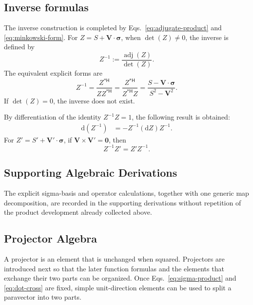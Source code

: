 \documentclass[10pt,letterpaper]{article}
\newcommand{\eqfunc}[1]{\operatorname{#1}}
\newcommand{\pv}[1]{#1}
\newcommand{\vct}[1]{\mathbf{#1}}
\newcommand{\sigv}{\vct{\pv{\bm{\sigma}}}}
\newcommand{\Hop}{\mathsf H}
\newcommand{\cherm}[1]{#1^{*\Hop}}
\newcommand{\detf}[1]{\eqfunc{det}\!\left(#1\right)}
\newcommand{\adjf}[1]{\eqfunc{adj}\!\left(#1\right)}
\newcommand{\dd}{\mathrm d}
\begin{document}
\subsection{Inverse formulas}
The inverse construction is completed by Eqs.\ \eqref{eq:adjugate-product} and \eqref{eq:minkowski-form}. For \(\pv{Z}=S+\vct{V}\cdot\sigv\), when \(\detf{\pv{Z}}\neq0\), the inverse is defined by
\begin{equation}
\pv{Z}^{-1}:=\frac{\adjf{\pv{Z}}}{\detf{\pv{Z}}}.
\label{eq:paravector-inverse}
\end{equation}
The equivalent explicit forms are
\begin{equation}
\pv{Z}^{-1}
=\frac{\cherm{\pv{Z}}}{\pv{Z}\cherm{\pv{Z}}}
=\frac{\cherm{\pv{Z}}}{\cherm{\pv{Z}}\pv{Z}}
=\frac{S-\vct{V}\cdot\sigv}{S^2-\vct{V}^2}.
\label{eq:paravector-inverse-explicit}
\end{equation}
If \(\detf{\pv{Z}}=0\), the inverse does not exist.

By differentiation of the identity \(\pv{Z}^{-1}\pv{Z}=1\), the following result is obtained:
\begin{align}
\dd(\pv{Z}^{-1}) &= -\pv{Z}^{-1}(\dd \pv{Z})\pv{Z}^{-1}.
\label{eq:paravector-inverse-diff}
\end{align}
For \(\pv{Z}'=S'+\vct{V}'\cdot\sigv\), if \(\vct{V}\times\vct{V}'=\vct{0}\), then
\begin{equation}
\pv{Z}^{-1}\pv{Z}'=\pv{Z}'\pv{Z}^{-1}.
\label{eq:inverse-commuting}
\end{equation}

\subsection{Supporting Algebraic Derivations}
The explicit sigma-basis and operator calculations, together with one generic map decomposition, are recorded in the supporting derivations without repetition of the product development already collected above.


\subsection{Projector Algebra}\label{sec:projectors}
A projector is an element that is unchanged when squared. Projectors are
introduced next so that the later function formulas and the elements that
exchange their two parts can be organized. Once Eqs.\
\eqref{eq:sigma-product} and \eqref{eq:dot-cross} are fixed, simple
unit-direction elements can be used to split a paravector into two parts.
\end{document}
